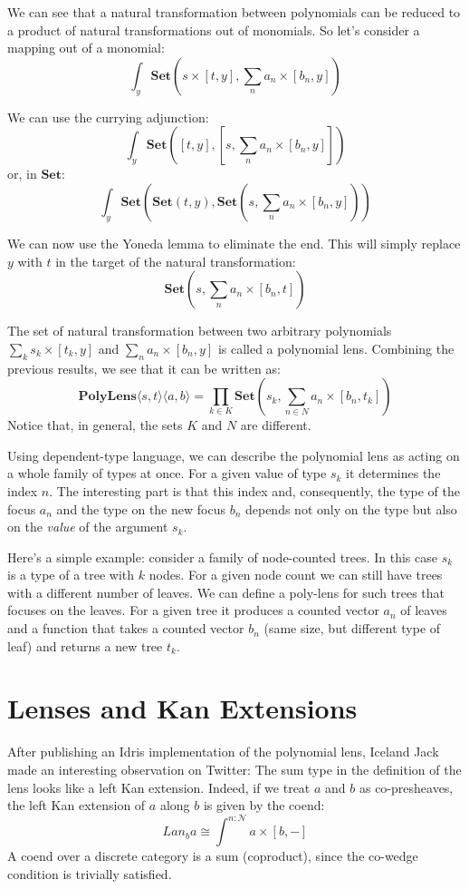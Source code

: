 \documentclass[11pt]{amsart}
\begin{document}
We can see that a natural transformation between polynomials can be reduced to a product of natural transformations out of monomials. So let's consider a mapping out of a monomial:
\[ \int_y \mathbf{Set} \left( s \times [t, y], \sum_n a_n \times [b_n, y]\right) \]
 
 We can use the currying adjunction:
\[ \int_y \mathbf{Set} \left( 
    [t, y],  \left[s, \sum_n a_n \times [b_n, y]\right]  \right) \]
 or, in $\mathbf{Set}$:
 \[ \int_y \mathbf{Set} \left( 
    \mathbf{Set}(t, y), \mathbf{Set} \left(s, \sum_n a_n \times [b_n, y]\right)  \right) \]

 We can now use the Yoneda lemma to eliminate the end. This will simply replace $y$ with $t$ in the target of the natural transformation:
 \[ \mathbf{Set}\left(s, \sum_n a_n \times [b_n, t] \right) \]
 
The set of natural transformation between two arbitrary polynomials $\sum_k s_k \times [t_k, y]$ and $\sum_n a_n \times [b_n, y]$ is called a polynomial lens. Combining the previous results, we see that it can be written as:
 \[ \mathbf{PolyLens}\langle s, t\rangle \langle a, b\rangle = \prod_{k \in K} \mathbf{Set}\left(s_k, \sum_{n \in N} a_n \times [b_n, t_k] \right) \]
Notice that, in general, the sets $K$ and $N$ are different. 

Using dependent-type language, we can describe the polynomial lens as acting on a whole family of types at once. For a given value of type $s_k$ it determines the index $n$. The interesting part is that this index and, consequently, the type of the focus $a_n$ and the type on the new focus $b_n$ depends not only on the type but also on the \emph{value} of the argument $s_k$. 

Here's a simple example: consider a family of node-counted trees. In this case $s_k$ is a type of a tree with $k$ nodes. For a given node count we can still have trees with a different number of leaves. We can define a poly-lens for such trees that focuses on the leaves. For a given tree it produces a counted vector $a_n$ of leaves and a function that takes a counted vector $b_n$  (same size, but different type of leaf) and returns a new tree $t_k$. 

\section{Lenses and Kan Extensions}
After publishing an Idris implementation of the polynomial lens, Iceland Jack made an interesting observation on Twitter: The sum type in the definition of the lens looks like a left Kan extension. Indeed, if we treat $a$ and $b$ as co-presheaves, the left Kan extension of $a$ along $b$ is given by the coend:
\[ Lan_b a \cong \int^{n \colon \mathcal{N}} a \times [b, -] \]
A coend over a discrete category is a sum (coproduct), since the co-wedge condition is trivially satisfied. 
\end{document}
